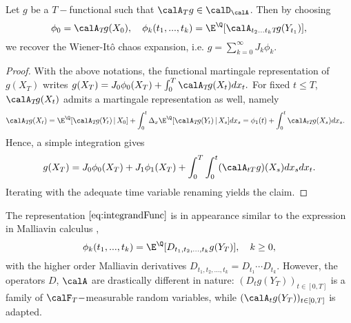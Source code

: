\begin{proposition} \label{prop:MRT_Chaos}
Let $g$ be a $T-$functional such that $\calA_T g \in \calD_{\calA}$. Then by choosing
\begin{equation}\label{eq:integrandFunc}
    \phi_0 = \calA_T \!  g(X_0) , \quad   \phi_k(t_1,...,t_k) = \E^{\Q}[\calA_{t_2...t_kT} \! g(Y_{t_1})], %
\end{equation}
 we recover the  Wiener-Itô chaos expansion, i.e. 
$g = \sum_{k=0}^{\infty} J_k \phi_k.$
\end{proposition}

\begin{proof}
With the above notations,  the functional martingale representation of $g(X_T)$ writes 
$ g(X_T) = J_0\phi_0(X_T) +\int_0^T \calA_{T}\!  g(X_{t}) dx_{t}.$ 
For fixed $t \le T$, $\calA_{T}\!  g(X_{t})$ admits a martingale representation as well, namely
\begin{align*}
    \calA_{T}\!  g(X_{t}) &= \E^{\Q}[\calA_{T}\!  g(Y_{t})\, | \, X_0] + \int_0^{t} \Delta_x \E^{\Q}[\calA_{T}\!  g(Y_{t})\, | \, X_{s}]  dx_{s}
    = \phi_1(t) + \int_0^{t} \calA_{t T}\!  g(X_{s}) dx_{s}.
\end{align*}
 Hence, a simple integration gives
$$  g(X_T) 
          = J_0\phi_0(X_T) +  J_1\phi_1(X_T)  + \int_0^T \int_0^{t}  (\calA_{t T} g)(X_{s}) dx_{s}  dx_{t}.$$
Iterating %
with the adequate %
time variable renaming yields the claim.
\end{proof} 
The representation  $\eqref{eq:integrandFunc}$ is in appearance similar to the expression  in Malliavin calculus \citep{Stroock}, 
 \begin{equation}\label{eq:stroock}
     \phi_k(t_1,...,t_k) = \E^{\Q}[D_{t_1,t_2,...,t_k}  g(Y_{T})],  \quad k\ge 0, %
 \end{equation}
 with the higher order Malliavin derivatives $D_{t_1,t_2,...,t_k}=D_{t_1}\cdots D_{t_k}$.  However, the operators $D$, $\calA$ are drastically different in nature:  $(D_t g(Y_{T}))_{t\in [0,T]}$ is a family of $\calF_T-$measurable random variables, while $(\calA_t g(Y_T))_{t\in [0,T]}$ is  adapted. %



